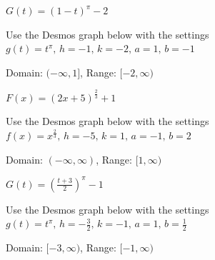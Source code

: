 \documentclass{ximera}
\begin{document}
\begin{question}
\begin{problem}
\begin{solution}
\end{solution} 
\end{problem}

\begin{problem} $G(t) = (1-t)^{\pi}-2$  

\begin{solution}
Use the Desmos graph below with the settings $g(t)=t^\pi,\,h=-1,\,k=-2,\,a=1,\,b=-1$

\begin{center} 
\end{center}

Domain:  $(-\infty,1]$, Range: $[-2, \infty)$

\end{solution} 
\end{problem}

\begin{problem} $F(x) =(2x+5)^{\frac{2}{3}}+1$  
\begin{solution}
Use the Desmos graph below with the settings $f(x)=x^\frac{2}{3},\,h=-5,\,k=1,\,a=-1,\,b=2$

\begin{center} 
\end{center}

Domain:  $(-\infty, \infty)$, Range: $[1, \infty)$

\end{solution} 
\end{problem}

\begin{problem}\label{powergraphexlast} 
$G(t) = \left( \frac{t+3}{2}\right)^{\pi}-1$ 

\begin{solution}
Use the Desmos graph below with the settings $g(t)=t^\pi,\,h=-\frac{3}{2},\,k=-1,\,a=1,\,b=\frac{1}{2}$

\begin{center} 
\end{center}

Domain:  $[-3, \infty)$, Range: $[-1, \infty)$

\end{solution} 
\end{problem}
\end{question}
\end{document}
